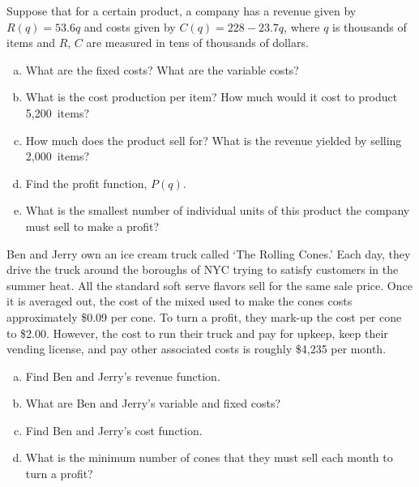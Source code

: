 \documentclass[11pt,letterpaper]{article}
\begin{document}

 Suppose that for a certain product, a company has a revenue given by $R(q)= 53.6q$ and costs given by $C(q)= 228 - 23.7q$, where $q$ is thousands of items and $R$, $C$ are measured in tens of thousands of dollars.
	\begin{enumerate}[(a)]
	\item What are the fixed costs? What are the variable costs?
	\item What is the cost production per item? How much would it cost to product 5,200~items?
	\item How much does the product sell for? What is the revenue yielded by selling 2,000~items?
	\item Find the profit function, $P(q)$.
	\item What is the smallest number of individual units of this product the company must sell to make a profit?
	\end{enumerate}



\newpage



 Ben and Jerry own an ice cream truck called `The Rolling Cones.' Each day, they drive the truck around the boroughs of NYC trying to satisfy customers in the summer heat. All the standard soft serve flavors sell for the same sale price. Once it is averaged out, the cost of the mixed used to make the cones costs approximately \$0.09 per cone. To turn a profit, they mark-up the cost per cone to \$2.00. However, the cost to run their truck and pay for upkeep, keep their vending license, and pay other associated costs is roughly \$4,235 per month. 
	\begin{enumerate}[(a)]
	\item Find Ben and Jerry's revenue function.
	\item What are Ben and Jerry's variable and fixed costs?
	\item Find Ben and Jerry's cost function. 
	\item What is the minimum number of cones that they must sell each month to turn a profit?
	\end{enumerate}



\newpage
\end{document}
